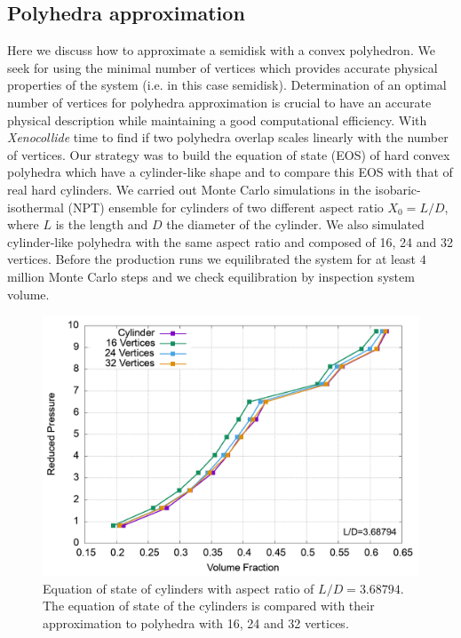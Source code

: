 \documentclass[aip,jcp, amsmath, amssymb, reprint]{revtex4-1}
\begin{document}

\subsection{Polyhedra approximation}
Here we discuss how to approximate a semidisk with a convex polyhedron. We seek for using the minimal number of vertices
which provides accurate physical properties of the system (i.e. in this case semidisk).
Determination of an optimal number of vertices for polyhedra approximation is crucial to have an accurate physical
description while maintaining a good computational efficiency.
With \textit{Xenocollide} time to find if two polyhedra overlap scales linearly with the number of vertices.
Our strategy was to build the equation of state (EOS) of hard convex polyhedra which have a cylinder-like shape and to 
compare this EOS with that of real hard cylinders.
We carried out Monte Carlo simulations in the isobaric-isothermal (NPT) ensemble for
cylinders of two different aspect ratio $X_0=L/D$, where $L$ is the length and $D$ the diameter of the cylinder. 
We also simulated cylinder-like polyhedra with the same aspect ratio and composed of 16, 24 and 32 vertices.
Before the production runs we equilibrated the system for at least $4$ million Monte Carlo steps and we check 
equilibration by inspection system volume.
\begin{figure}[h!] \includegraphics[width=0.9\linewidth]{cylapprox.png}
  \caption{\label{fig:cylapprox} Equation of state of cylinders with aspect ratio of $L/D=3.68794$. The equation of
  state of the cylinders is compared with their approximation to polyhedra with 16, 24 and 32 vertices.}
\end{figure}
\end{document}
